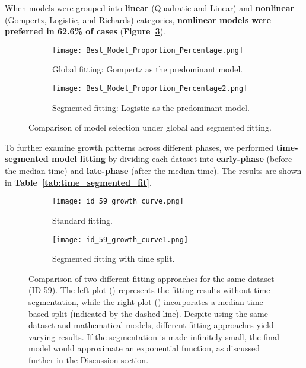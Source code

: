 \documentclass{article}
\begin{document}
When models were grouped into \textbf{linear} (Quadratic and Linear) and \textbf{nonlinear} (Gompertz, Logistic, and Richards) categories, \textbf{nonlinear models were preferred in 62.6\% of cases} (\textbf{Figure~\ref{fig:model_selection_comparison}}).

\begin{figure}[h]
    \centering
    \begin{subfigure}{0.48\textwidth}
        \centering
        \texttt{[image: Best\_Model\_Proportion\_Percentage.png]}
        \caption{Global fitting: Gompertz as the predominant model.}
        \label{fig:global_fitting}
    \end{subfigure}
    \hfill
    \begin{subfigure}{0.48\textwidth}
        \centering
        \texttt{[image: Best\_Model\_Proportion\_Percentage2.png]}
        \caption{Segmented fitting: Logistic as the predominant model.}
        \label{fig:segmented_fitting}
    \end{subfigure}
    \caption{Comparison of model selection under global and segmented fitting.}
    \label{fig:model_selection_comparison}
\end{figure}

To further examine growth patterns across different phases, we performed \textbf{time-segmented model fitting} by dividing each dataset into \textbf{early-phase} (before the median time) and \textbf{late-phase} (after the median time). The results are shown in \textbf{Table~\ref{tab:time_segmented_fit}}.
\begin{figure}[htbp]
    \centering
    \begin{subfigure}[b]{0.45\textwidth}
        \centering
        \texttt{[image: id\_59\_growth\_curve.png]}
        \caption{Standard fitting.}
        \label{fig:standard_fitting}
    \end{subfigure}
    \hfill
    \begin{subfigure}[b]{0.45\textwidth}
        \centering
        \texttt{[image: id\_59\_growth\_curve1.png]}
        \caption{Segmented fitting with time split.}
        \label{fig:segmented_fitting}
    \end{subfigure}
    \caption{Comparison of two different fitting approaches for the same dataset (ID 59). The left plot () represents the fitting results without time segmentation, while the right plot () incorporates a median time-based split (indicated by the dashed line). Despite using the same dataset and mathematical models, different fitting approaches yield varying results. If the segmentation is made infinitely small, the final model would approximate an exponential function, as discussed further in the Discussion section.}
    \label{fig:fitting_comparison}
\end{figure}
\end{document}
